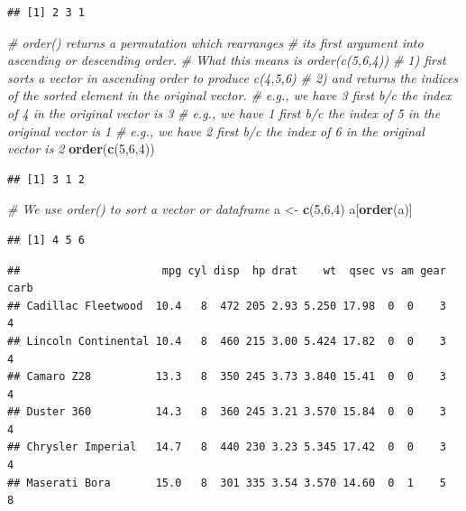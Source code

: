 \documentclass[]{book}
\newenvironment{Shaded}{\begin{snugshade}}{\end{snugshade}}
\newcommand{\CommentTok}[1]{\textcolor[rgb]{0.56,0.35,0.01}{\textit{#1}}}
\newcommand{\DecValTok}[1]{\textcolor[rgb]{0.00,0.00,0.81}{#1}}
\newcommand{\KeywordTok}[1]{\textcolor[rgb]{0.13,0.29,0.53}{\textbf{#1}}}
\newcommand{\NormalTok}[1]{#1}
\newcommand{\OperatorTok}[1]{\textcolor[rgb]{0.81,0.36,0.00}{\textbf{#1}}}
\newcommand{\StringTok}[1]{\textcolor[rgb]{0.31,0.60,0.02}{#1}}
\begin{document}
\begin{verbatim}
## [1] 2 3 1
\end{verbatim}

\begin{Shaded}
\begin{Highlighting}[]
\CommentTok{# order() returns a permutation which rearranges }
\CommentTok{# its first argument into ascending or descending order. }
\CommentTok{# What this means is order(c(5,6,4)) }
\CommentTok{# 1) first sorts a vector in ascending order to produce c(4,5,6)}
\CommentTok{# 2) and returns the indices of the sorted element in the original vector. }
\CommentTok{# e.g., we have 3 first b/c the index of 4 in the original vector is 3}
\CommentTok{# e.g., we have 1 first b/c the index of 5 in the original vector is 1}
\CommentTok{# e.g., we have 2 first b/c the index of 6 in the original vector is 2}
\KeywordTok{order}\NormalTok{(}\KeywordTok{c}\NormalTok{(}\DecValTok{5}\NormalTok{,}\DecValTok{6}\NormalTok{,}\DecValTok{4}\NormalTok{))}
\end{Highlighting}
\end{Shaded}

\begin{verbatim}
## [1] 3 1 2
\end{verbatim}

\begin{Shaded}
\begin{Highlighting}[]
\CommentTok{# We use order() to sort a vector or dataframe}
\NormalTok{a <-}\StringTok{ }\KeywordTok{c}\NormalTok{(}\DecValTok{5}\NormalTok{,}\DecValTok{6}\NormalTok{,}\DecValTok{4}\NormalTok{)}
\NormalTok{a[}\KeywordTok{order}\NormalTok{(a)]}
\end{Highlighting}
\end{Shaded}

\begin{verbatim}
## [1] 4 5 6
\end{verbatim}

\begin{Shaded}
\end{Shaded}

\begin{verbatim}
##                      mpg cyl disp  hp drat    wt  qsec vs am gear carb
## Cadillac Fleetwood  10.4   8  472 205 2.93 5.250 17.98  0  0    3    4
## Lincoln Continental 10.4   8  460 215 3.00 5.424 17.82  0  0    3    4
## Camaro Z28          13.3   8  350 245 3.73 3.840 15.41  0  0    3    4
## Duster 360          14.3   8  360 245 3.21 3.570 15.84  0  0    3    4
## Chrysler Imperial   14.7   8  440 230 3.23 5.345 17.42  0  0    3    4
## Maserati Bora       15.0   8  301 335 3.54 3.570 14.60  0  1    5    8
\end{verbatim}
\end{document}
